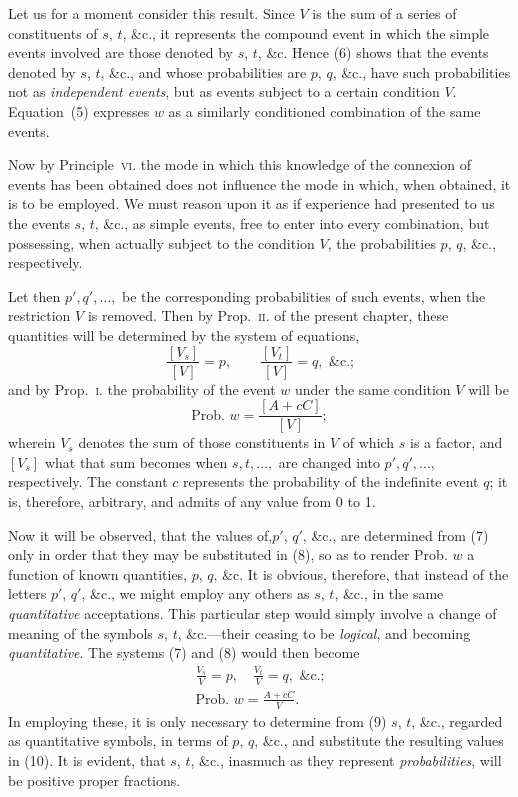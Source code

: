 \documentclass[oneside]{book}
\begin{document}
Let us for a moment consider this result. Since $V$ is the sum
of a series of constituents of $s$, $t$, \&c., it represents the compound
event in which the simple events involved are those denoted by
$s$, $t$, \&c. Hence (6) shows that the events denoted by $s$, $t$, \&c.,
and whose probabilities are $p$, $q$, \&c., have such probabilities not
as \emph{independent events}, but as events subject to a certain condition
$V$. Equation~(5) expresses $w$ as a similarly conditioned combination of the same events.

Now by Principle~\textsc{vi.} the mode in which this knowledge of the
connexion of events has been obtained does not influence the mode
in which, when obtained, it is to be employed. We must reason
upon it as if experience had presented to us the events $s$, $t$, \&c.,
as simple events, free to enter into every combination, but possessing, when actually subject to the condition $V$, the probabilities $p$, $q$, \&c., respectively.

Let then $p', q', \dotsc,$ be the corresponding probabilities of such
events, when the restriction $V$ is removed. Then by Prop.~\textsc{ii.}
of the present chapter, these quantities will be determined by the
system of equations,
\[
  \frac{[V_s]}{[V]} = p, \qquad
  \frac{[V_t]}{[V]} = q, \text{ \&c.;}  \tag{7}
\]
and by Prop.~\textsc{i.} the probability of the event $w$ under the same
condition $V$ will be
\[
  \text{Prob. } w = \frac{[A + cC]}{[V]};   \tag{8}
\]
wherein $V_s$ denotes the sum of those constituents in $V$ of which $s$
is a factor, and $[V_s]$ what that sum becomes when $s, t, \dotsc,$ are
changed into $p', q', \dotsc,$ respectively. The constant $c$ represents
the probability of the indefinite event $q$; it is, therefore, arbitrary,
and admits of any value from 0 to 1.

Now it will be observed, that the values of,$p'$, $q'$, \&c., are determined from (7) only in order that they may be substituted in
(8), so as to render Prob. $w$ a function of known quantities, $p$, $q$,
\&c. It is obvious, therefore, that instead of the letters $p'$, $q'$, \&c.,
we might employ any others as $s$, $t$, \&c., in the same \emph{quantitative}
acceptations. This particular step would simply involve a change
of meaning of the symbols $s$, $t$, \&c.---their ceasing to be \emph{logical},
and becoming \emph{quantitative}. The systems (7) and (8) would then
become
\begin{gather}
  \frac{V_s}{V} = p,\quad
  \frac{V_t}{V} = q,\text{ \&c.;}       \tag{9}   \\
  \text{Prob. }w = \frac{A + cC}{V}.    \tag{10}
\end{gather}
In employing these, it is only necessary to determine from (9)
$s$, $t$, \&c., regarded as quantitative symbols, in terms of $p$, $q$, \&c.,
and substitute the resulting values in (10). It is evident, that
$s$, $t$, \&c., inasmuch as they represent \emph{probabilities}, will be positive
proper fractions.
\end{document}
